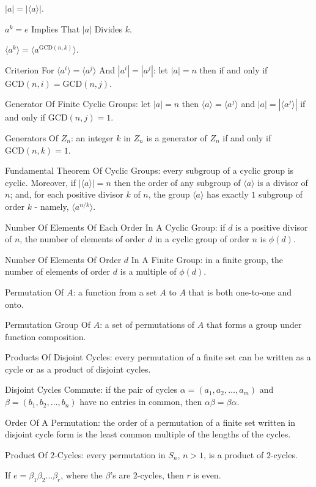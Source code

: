 $|a|=| \langle a \rangle |$.

$a^k=e$ Implies That $|a|$ Divides $k$.

$\langle a^k \rangle = \langle a^{\text{GCD}(n,k)} \rangle$.

Criterion For $\langle a^i \rangle = \langle a^j \rangle$ And $|a^i|=|a^j|$: let $|a| = n$ then if and only if $\text{GCD}(n,i) = \text{GCD}(n,j)$.

Generator Of Finite Cyclic Groups: let $|a| = n$ then $\langle a \rangle = \langle a^j \rangle$ and $|a|=| \langle a^j \rangle |$ if and only if $\text{GCD}(n,j)=1$.

Generators Of $Z_n$: an integer $k$ in $Z_n$ is a generator of $Z_n$ if and only if $\text{GCD}(n,k) = 1$.

Fundamental Theorem Of Cyclic Groups: every subgroup of a cyclic group is cyclic. Moreover, if $| \langle a \rangle |=n$ then the order of any subgroup of $\langle a \rangle$ is a divisor of $n$; and, for each positive divisor $k$ of $n$, the group $\langle a \rangle$ has exactly $1$ subgroup of order $k$ - namely, $\langle a^{n/k} \rangle$.

Number Of Elements Of Each Order In A Cyclic Group: if $d$ is a positive divisor of $n$, the number of elements of order $d$ in a cyclic group of order $n$ is $\phi (d)$.

Number Of Elements Of Order $d$ In A Finite Group: in a finite group, the number of elements of order $d$ is a multiple of $\phi (d)$.

Permutation Of $A$: a function from a set $A$ to $A$ that is both one-to-one and onto.

Permutation Group Of $A$: a set of permutations of $A$ that forms a group under function composition.

Products Of Disjoint Cycles: every permutation of a finite set can be written as a cycle or as a product of disjoint cycles.

Disjoint Cycles Commute: if the pair of cycles $\alpha = (a_1,a_2,\dots,a_m)$ and $\beta = (b_1,b_2,\dots,b_n)$ have no entries in common, then $\alpha \beta = \beta \alpha$.

Order Of A Permutation: the order of a permutation of a finite set written in disjoint cycle form is the least common multiple of the lengths of the cycles.

Product Of $2$-Cycles: every permutation in $S_n$, $n>1$, is a product of $2$-cycles.

If $e=\beta_1 \beta_2 \dots \beta_r$, where the $\beta$'s are $2$-cycles, then $r$ is even.

